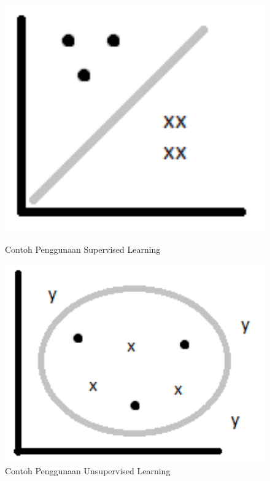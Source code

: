 \begin{enumerate}
\begin{figure}
\centerline{\includegraphics[width=1\textwidth]{figures/fathi/chapter2/2.PNG}}
\caption{Contoh Penggunaan Supervised Learning}
\label{proses2}

\centerline{\includegraphics[width=1\textwidth]{figures/fathi/chapter2/3.PNG}}
\caption{Contoh Penggunaan Unsupervised Learning}
\label{proses3}


\end{figure}
\end{enumerate}
